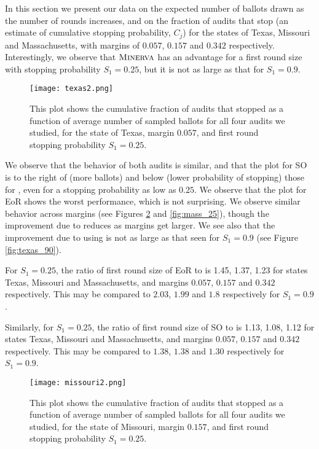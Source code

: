 In this section we present our data on the expected number of ballots drawn as the number of rounds increases, and on the fraction of audits that stop (an estimate of cumulative stopping probability, $C_j$) for the states of Texas, Missouri and Massachusetts, with margins of $0.057$, $0.157$ and $0.342$ respectively. Interestingly, we observe that $\textsc{Minerva}$ has an advantage for a first round size with stopping probability $S_1=0.25$, but it is not as large as that for $S_1=0.9$. 

\begin{figure}
\begin{centering}
\texttt{[image: texas2.png]}
\caption{This plot shows the cumulative fraction of audits that stopped as a function of average number of sampled ballots for all four audits we studied, for the state of Texas, margin $0.057$, and first round stopping probability $S_1=0.25$.}
\label{fig:texas_25}
\end{centering}
\end{figure}

We observe that the behavior of both \Minerva audits is similar, and that the plot for SO \BRAVO is to the right of (more ballots) and below (lower probability of stopping) those for \Minerva, even for a stopping probability as low as $0.25$. We observe that the plot for EoR \BRAVO shows the worst performance, which is not surprising. We observe similar behavior across margins (see Figures \ref{fig:missouri_25} and \ref{fig:mass_25}), though the improvement due to \Minerva reduces as margins get larger. We see also that the improvement due to using \Minerva is not as large as that seen for $S_1=0.9$ (see Figure \ref{fig:texas_90}). 

For $S_1=0.25$, the ratio of first round size of EoR \BRAVO to \Minerva is 1.45, 1.37, 1.23 for states Texas, Missouri and Massachusetts, and margins $0.057$, $0.157$ and $0.342$ respectively. This may be compared to $2.03$, $1.99$ and $1.8$ respectively for $S_1=0.9$. 

Similarly, for $S_1=0.25$, the ratio of first round size of SO \BRAVO to \Minerva is 1.13, 1.08, 1.12 for states Texas, Missouri and Massachusetts, and margins $0.057$, $0.157$ and $0.342$ respectively. This may be compared to $1.38$, $1.38$ and $1.30$ respectively for $S_1=0.9$. 

\begin{figure}
\begin{centering}
\texttt{[image: missouri2.png]}
\caption{This plot shows the cumulative fraction of audits that stopped as a function of average number of sampled ballots for all four audits we studied, for the state of Missouri, margin $0.157$, and first round stopping probability $S_1=0.25$.}
\label{fig:missouri_25}
\end{centering}
\end{figure}

